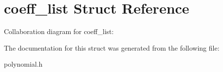 \hypertarget{structcoeff__list}{\section{coeff\-\_\-list Struct Reference}
\label{structcoeff__list}
}


Collaboration diagram for coeff\-\_\-list\-:


The documentation for this struct was generated from the following file\-:\begin{DoxyCompactItemize}
\item 
polynomial.\-h\end{DoxyCompactItemize}
